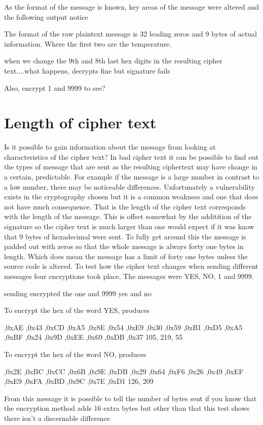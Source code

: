 As the format of the message is known, key areas of the message were altered and the following output notice

The format of the raw plaintext message is 32 leading zeros and 9 bytes of actual information. Where the first two are the temperature. 

when we change the 9th and 8th last hex digits in the resulting cipher text....what happens, decrypts fine but signature fails


Also, encrypt 1 and 9999 to see?


\section{Length of cipher text}

Is it possible to gain information about the message from looking at characteristics of the cipher text? In bad cipher text it can be possible to find out the types of message that are sent as the resulting ciphertext may have change in a certain, predictable. For example if the message is a large number in contrast to a low number, there may be noticeable differences. Unfortunately a vulnerability exists in the cryptography chosen but it is a common weakness and one that does not have much consequence. That is the length of the cipher text corresponds with the length of the message. This is offset somewhat by the additition of the signature so the cipher text is much larger than one would expect if it was know that 9 bytes of hexadecimal were sent. To fully get around this the message is padded out with zeros so that the whole message is always forty one bytes in length. Which does mean the message has a limit of forty one bytes unless the source code is altered. To test how the cipher text changes when sending different messages four encryptions took place. The messages were YES, NO, 1 and 9999. 

sending encrypted the one and 9999
yes and no

To encrypt the hex of the word YES, produces 

,0xAE ,0x43 ,0xCD ,0xA5 ,0x8E ,0x54 ,0xE9 ,0x30
 ,0x59 ,0xB1 ,0xD5 ,0xA5 ,0xBF ,0x24 ,0x9D ,0xEE
 ,0x69 ,0xDB ,0x37
 105, 219, 55

To encrypt the hex of the word NO, produces 

 ,0x2E ,0xBC ,0xCC ,0x6B ,0x9E ,0xDB ,0x29 ,0x64
 ,0xF6 ,0x26 ,0x49 ,0xEF ,0xE9 ,0xFA ,0xBD ,0x9C
 ,0x7E ,0xD1
126, 209

From this message it is possible to tell the number of bytes sent if you know that the encryption method adds 16 extra bytes but other than that this test shows there isn't a discernable difference


